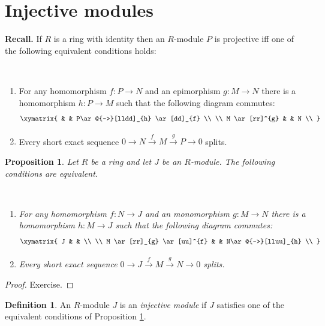 \documentclass[12pt, letterpaper, oneside]{article}
\theoremstyle{plain}
\newtheorem{proposition}[theorem]{Proposition}
\theoremstyle{definition}
\newtheorem{definition}[theorem]{Definition}
\newcommand{\lra}{\longrightarrow}
\newcommand{\benu}{\begin{enumerate}}
\newcommand{\eenu}{\end{enumerate}}
\newcommand{\vs}{\vskip 5mm}
\newcommand{\isep}[1][0]{\setlength{\itemsep}{#1 mm}}
\begin{document}


\newpage
\section{Injective modules}
\label{SEC_INJECTIVEMOD}


\textbf{Recall.}
If $R$ is a ring with identity then an $R$-module $P$ is projective iff one of the following equivalent 
conditions holds:

\vskip -13mm

\ 
\benu
\isep[5]
\item For any homomorphism $f\colon P\to N$ and an epimorphism $g\colon M\to N$
there is a homomorphism $h\colon P\to M$ such that the following diagram commutes:
 $$
\xymatrix{
& & P\ar@{-->}[lldd]_{h} \ar[dd]_{f} \\
\\
M \ar[rr]^{g}  & & N \\
}
$$ 
\item Every short exact sequence  $0 \to N \overset{f}{\lra} M \overset{g}{\lra} P \to 0$
splits. 
\eenu


\vs\vs


\begin{proposition}
\label{PROP_INJEQUIVCOND}
Let $R$ be a ring and let $J$ be an $R$-module. The following conditions are equivalent. 

\vskip -13mm

\ 
\benu
\isep[5]
\item For any homomorphism $f\colon N\to J$ and an monomorphism $g\colon M\to N$
there is a homomorphism $h\colon M\to J$ such that the following diagram commutes:
 $$
\xymatrix{
J & &  \\
\\
M \ar[rr]_{g} \ar[uu]^{f} & & N\ar@{-->}[lluu]_{h}   \\
}
$$ 
\item Every short exact sequence  $0 \to J \overset{f}{\lra} M \overset{g}{\lra} N \to 0$
splits. 
\eenu

\end{proposition}


\begin{proof} Exercise. 
\end{proof}


\vs\vs

\begin{definition}
An $R$-module $J$ is an \emph{injective module} if $J$ satisfies one of the equivalent conditions 
of Proposition \ref{PROP_INJEQUIVCOND}.
\end{definition}
\end{document}
